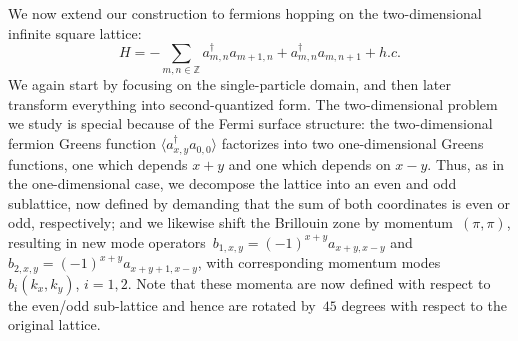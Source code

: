 \documentclass[aps,pra,reprint,superscriptaddress,floatfix,amsmath,amssymb,amsfonts]{revtex4-1}
\newcommand*{\Z}{\mathbb Z}
\begin{document}
We now extend our construction to fermions hopping on the two-dimensional infinite square lattice:
\begin{equation}\label{eq:hamiltonian 2d}
  H = - \sum_{m,n\in\Z} a_{m,n}^\dagger a_{m+1,n} + a_{m,n}^\dagger a_{m,n+1} + h.c.
\end{equation}
We again start by focusing on the single-particle domain, and then later transform everything into second-quantized form.
The two-dimensional problem we study is special because of the Fermi surface structure: the two-dimensional fermion Greens function $\langle a^\dagger_{x,y} a_{0,0} \rangle$ factorizes into two one-dimensional Greens functions, one which depends $x+y$ and one which depends on $x-y$. Thus, as in the one-dimensional case, we decompose the lattice into an even and odd sublattice, now defined by demanding that the sum of both coordinates is even or odd, respectively; and we likewise shift the Brillouin zone by momentum~$(\pi,\pi)$, resulting in new mode operators~$b_{1,x,y}=(-1)^{x+y} a_{x+y,x-y}$ and~$b_{2,x,y}=(-1)^{x+y} a_{x+y+1,x-y}$, with corresponding momentum modes~$b_i(k_x,k_y)$, $i=1,2$.
Note that these momenta are now defined with respect to the even/odd sub-lattice and hence are rotated by~$45$ degrees with respect to the original lattice.
\end{document}
